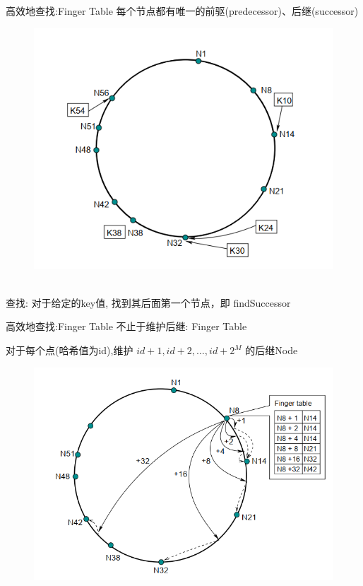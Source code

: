 \documentclass[10pt]{beamer}
\begin{document}
\begin{frame}{高效地查找:Finger Table}
每个节点都有唯一的前驱(predecessor)、后继(successor)

\begin{figure}
\centering
\includegraphics[scale=0.5]{figure/ring.png}
\end{figure}

\\[20pt]

查找: 对于给定的key值, 找到其后面第一个节点，即 \alert{findSuccessor}
\end{frame}

\begin{frame}{高效地查找:Finger Table}
不止于维护后继: \alert{Finger Table}

对于每个点(哈希值为id),维护 $id+1, id+2, \dots, id+2^M$ 的后继Node

\begin{figure}
\centering
\includegraphics[scale=0.5]{figure/finger.png}
\end{figure}

\\[20pt]

\end{frame}
\end{document}
